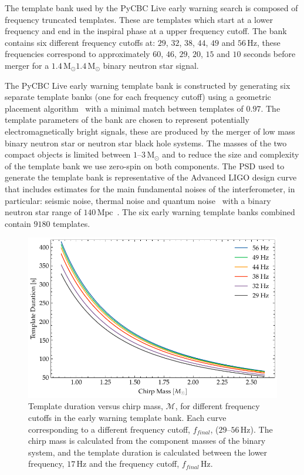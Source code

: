 The template bank used by the PyCBC Live early warning search is composed of frequency truncated templates. These are \gwadj templates which start at a lower frequency and end in the inspiral phase at a upper frequency cutoff. The bank contains six different frequency cutoffs at: $29$, $32$, $38$, $44$, $49$ and $56 \, \text{Hz}$, these frequencies correspond to approximately $60$, $46$, $29$, $20$, $15$ and $10$ seconds before merger for a $1.4 \, \text{M$_\odot$}$\text{--}$1.4\, \text{M$_\odot$}$ binary neutron star signal.

The PyCBC Live early warning template bank is constructed by generating six separate template banks (one for each frequency cutoff) using a geometric placement algorithm~\cite{Harry_Lundgren:2012} with a minimal match between templates of $0.97$. The template parameters of the bank are chosen to represent potentially electromagnetically bright signals, these are produced by the merger of low mass binary neutron star or neutron star black hole systems. The masses of the two compact objects is limited between $1\text{--}3 \, \text{M$_\odot$}$ and to reduce the size and complexity of the template bank we use zero-spin on both components. The PSD used to generate the template bank is representative of the Advanced LIGO design curve that includes estimates for the main fundamental noises of the interferometer, in particular: seismic noise, thermal noise and quantum noise~\cite{aLIGO_design_curve:2018} with a binary neutron star range of $140 \, \text{Mpc}$~\cite{ligo_prospects:2016}. The six early warning template banks combined contain $9180$ templates.
%
\begin{figure}
    \centering
    \includegraphics[width=\textwidth]{images/6_earlywarning/search/template_bank_duration_mchirp.pdf}
    \caption{Template duration versus chirp mass, $\mathcal{M}$, for different frequency cutoffs in the early warning template bank. Each curve corresponding to a different frequency cutoff, $f_{final}$, ($29\text{--}56  \, \text{Hz}$). The chirp mass is calculated from the component masses of the binary system, and the template duration is calculated between the lower frequency, $17 \, \text{Hz}$ and the frequency cutoff, $f_{final} \, \text{Hz}$.}
    \label{6:fig:tb_duration_mchirp}
\end{figure}
